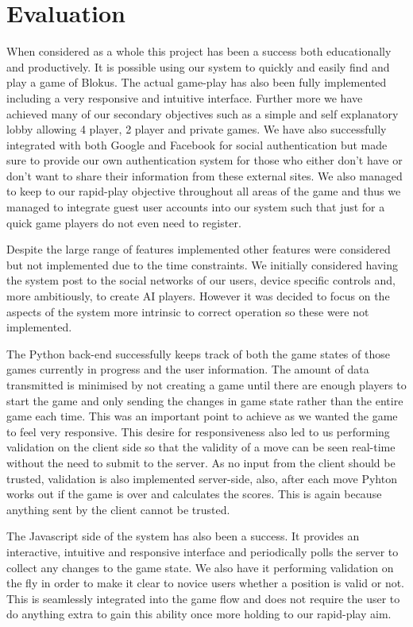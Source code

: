 \section{Evaluation}
When considered as a whole this project has been a success both educationally and productively. It is possible using our system to quickly and easily find and play a game of Blokus. The actual game-play has also been fully implemented including a very responsive and intuitive interface. Further more we have achieved many of our secondary objectives such as a simple and self explanatory lobby allowing 4 player, 2 player and private games. We have also successfully integrated with both Google and Facebook for social authentication but made sure to provide our own authentication system for those who either don’t have or don’t want to share their information from these external sites. We also managed to keep to our rapid-play objective throughout all areas of the game and thus we managed to integrate guest user accounts into our system such that just for a quick game players do not even need to register.

Despite the large range of features implemented other features were considered but not implemented due to the time constraints. We initially considered having the system post to the social networks of our users, device specific controls and, more ambitiously, to create AI players. However it was decided to focus on the aspects of the system more intrinsic to correct operation so these were not implemented.

The Python back-end successfully keeps track of both the game states of those games currently in progress and the user information. The amount of data transmitted is minimised by not creating a game until there are enough players to start the game and only sending the changes in game state rather than the entire game each time. This was an important point to achieve as we wanted the game to feel very responsive. This desire for responsiveness also led to us performing validation on the client side so that the validity of a move can be seen real-time without the need to submit to the server. As no input from the client should be trusted, validation is also implemented server-side, also, after each move Pyhton works out if the game is over and calculates the scores. This is again because anything sent by the client cannot be trusted.

The Javascript side of the system has also been a success. It provides an interactive, intuitive and responsive interface and periodically polls the server to collect any changes to the game state. We also have it performing validation on the fly in order to make it clear to novice users whether a position is valid or not. This is seamlessly integrated into the game flow and does not require the user to do anything extra to gain this ability once more holding to our rapid-play aim.

